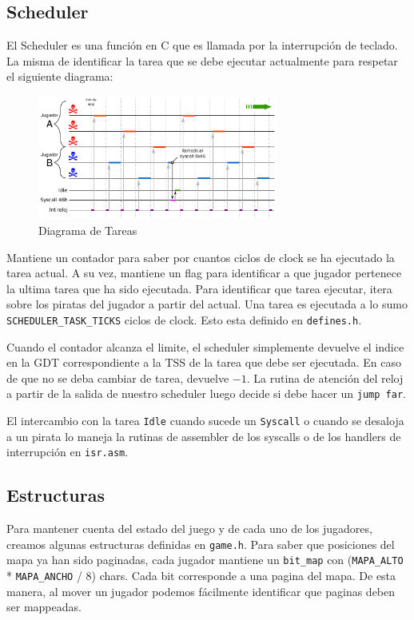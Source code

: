 \pagebreak

\subsection{Scheduler}

El Scheduler es una función en C que es llamada por la interrupción de teclado. La misma de identificar la tarea que se debe ejecutar actualmente para respetar el siguiente diagrama:

\begin{figure}[H]
  \centering
    \includegraphics[width=0.7\textwidth]{images/scheduler}
  \caption{Diagrama de Tareas}
\end{figure}

Mantiene un contador para saber por cuantos ciclos de clock se ha ejecutado la tarea actual. A su vez, mantiene un flag para identificar a que jugador pertenece la ultima tarea que ha sido ejecutada. Para identificar que tarea ejecutar, itera sobre los piratas del jugador a partir del actual. Una tarea es ejecutada a lo sumo \texttt{SCHEDULER\_TASK\_TICKS} ciclos de clock. Esto esta definido en \texttt{defines.h}.

Cuando el contador alcanza el limite, el scheduler simplemente devuelve el indice en la GDT correspondiente a la TSS de la tarea que debe ser ejecutada. En caso de que no se deba cambiar de tarea, devuelve $-1$. La rutina de atención del reloj a partir de la salida de nuestro scheduler luego decide si debe hacer un \texttt{jump far}.

El intercambio con la tarea \texttt{Idle} cuando sucede un \texttt{Syscall} o cuando se desaloja a un pirata lo maneja la rutinas de assembler de los syscalls o de los handlers de interrupción en \texttt{isr.asm}.

\subsection{Estructuras}

Para mantener cuenta del estado del juego y de cada uno de los jugadores, creamos algunas estructuras definidas en \texttt{game.h}. Para saber que posiciones del mapa ya han sido paginadas, cada jugador mantiene un \texttt{bit\_map} con (\texttt{MAPA\_ALTO} * \texttt{MAPA\_ANCHO} / 8) chars. Cada bit corresponde a una pagina del mapa. De esta manera, al mover un jugador podemos fácilmente identificar que paginas deben ser mappeadas.

